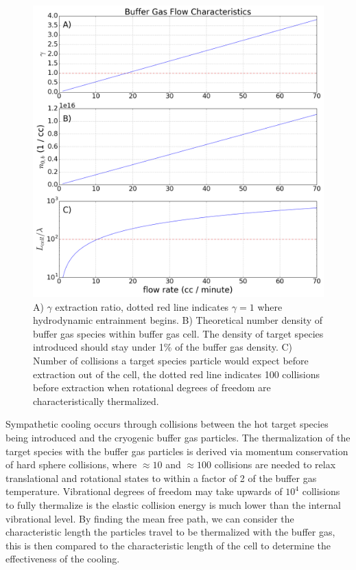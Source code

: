 \begin{figure}[H]
	\centering
	\includegraphics[width=1\textwidth]{images/CBGB_flow_characteristic.png}
	\caption{A) $\gamma$ extraction ratio, dotted red line indicates $\gamma = 1$ where hydrodynamic entrainment begins. B) Theoretical number density of buffer gas species within buffer gas cell. The density of target species introduced should stay under 1\% of the buffer gas density. C) Number of collisions a target species particle would expect before extraction out of the cell, the dotted red line indicates 100 collisions before extraction when rotational degrees of freedom are characteristically thermalized.}
	\label{f: buffer_gas_flow}
\end{figure}

Sympathetic cooling occurs through collisions between the hot target species being introduced and the cryogenic buffer gas particles. The thermalization of the target species with the buffer gas particles is derived via momentum conservation of hard sphere collisions, where $\approx 10$ and $\approx 100$ collisions are needed to relax translational and rotational states to within a factor of 2 of the buffer gas temperature. Vibrational degrees of freedom may take upwards of $10^4$ collisions to fully thermalize is the elastic collision energy is much lower than the internal vibrational level. By finding the mean free path, we can consider the characteristic length the particles travel to be thermalized with the buffer gas, this is then compared to the characteristic length of the cell to determine the effectiveness of the cooling.

